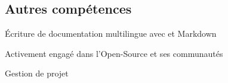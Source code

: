 \documentclass[]{resume-openfont}
\begin{document}
\begin{minipage}[t]{0.31\textwidth}
\subsection{Autres compétences}
\vspace{2pt}
\vspace{\topsep} %
\begin{tightemize}
  \item Écriture de documentation multilingue avec  et Markdown
  \item Activement engagé dans l'Open-Source et ses communautés
  \item Gestion de projet
\end{tightemize}


%
%
\end{minipage}%
\hfill%
\end{document}
